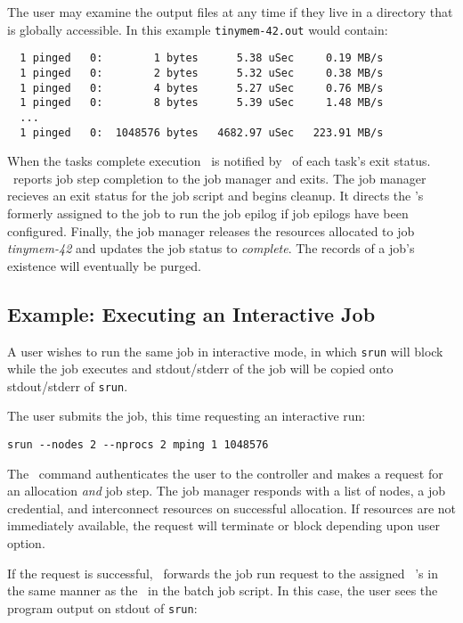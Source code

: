 The user may examine the output files at any time if they live
in a directory that is globally accessible. In this example
{\tt tinymem-42.out} would  contain:

\begin{verbatim}
  1 pinged   0:        1 bytes      5.38 uSec     0.19 MB/s                     
  1 pinged   0:        2 bytes      5.32 uSec     0.38 MB/s                     
  1 pinged   0:        4 bytes      5.27 uSec     0.76 MB/s                     
  1 pinged   0:        8 bytes      5.39 uSec     1.48 MB/s                     
  ...
  1 pinged   0:  1048576 bytes   4682.97 uSec   223.91 MB/s              
\end{verbatim}

When the tasks complete execution \srun\ is notified by \slurmd\ of each
task's exit status. \srun\ reports job step completion to the job manager
and exits. The job manager recieves an exit status for the job script
and begins cleanup. It directs the \slurmd 's formerly assigned to the
job to run the job epilog if job epilogs have been configured. Finally,
the job manager releases the resources allocated to job {\em tinymem-42}
and updates the job status to {\em complete}. The records of a job's
existence will eventually be purged.

\subsection{Example:  Executing an Interactive Job}

A user wishes to run the same job in interactive mode, in which {\tt srun}
will block while the job executes and stdout/stderr of the job will be 
copied onto stdout/stderr of {\tt srun}.

The user submits the job, this time requesting an interactive run:
\begin{verbatim}
srun --nodes 2 --nprocs 2 mping 1 1048576
\end{verbatim}

The \srun\ command authenticates the user to the controller and
makes a request for an allocation {\em and} job step. The job manager
responds with a list of nodes, a job credential, and interconnect
resources on successful allocation. If resources are not immediately
available, the request will terminate or block depending upon user
option.

If the request is successful, \srun\ forwards the job run request
to the assigned \slurmd~'s in the same manner as the \srun\ in the
batch job script. In this case, the user sees the program output on 
stdout of {\tt srun}:

